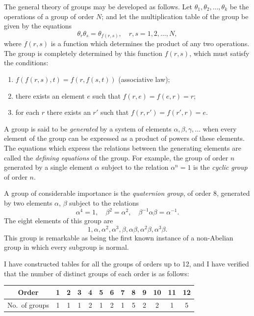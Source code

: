 \documentclass[11pt,a4paper]{article}
\begin{document}
\setcounter{page}{90}

The general theory of groups may be developed as follows. Let $\theta_1, \theta_2, \ldots, \theta_k$ be the operations of a group of order $N$; and let the multiplication table of the group be given by the equations
\[
\theta_r \theta_s = \theta_{f(r,s)}, \quad r,s = 1,2,\ldots,N,
\]
where $f(r,s)$ is a function which determines the product of any two operations. The group is completely determined by this function $f(r,s)$, which must satisfy the conditions:
\begin{enumerate}[label=(\roman*)]
\item $f(f(r,s),t) = f(r,f(s,t))$ (associative law);
\item there exists an element $e$ such that $f(r,e)=f(e,r)=r$;
\item for each $r$ there exists an $r'$ such that $f(r,r')=f(r',r)=e$.
\end{enumerate}

\setcounter{page}{91}

A group is said to be \textit{generated} by a system of elements $\alpha, \beta, \gamma, \ldots$ when every element of the group can be expressed as a product of powers of these elements. The equations which express the relations between the generating elements are called the \textit{defining equations} of the group. For example, the group of order $n$ generated by a single element $\alpha$ subject to the relation $\alpha^n = 1$ is the \textit{cyclic group} of order $n$.

A group of considerable importance is the \textit{quaternion group}, of order 8, generated by two elements $\alpha$, $\beta$ subject to the relations
\[
\alpha^4 = 1, \quad \beta^2 = \alpha^2, \quad \beta^{-1}\alpha\beta = \alpha^{-1}.
\]
The eight elements of this group are
\[
1, \alpha, \alpha^2, \alpha^3, \beta, \alpha\beta, \alpha^2\beta, \alpha^3\beta.
\]
This group is remarkable as being the first known instance of a non-Abelian group in which every subgroup is normal.

\setcounter{page}{92}

I have constructed tables for all the groups of orders up to 12, and I have verified that the number of distinct groups of each order is as follows:

\begin{center}
\begin{tabular}{c|cccccccccccc}
\toprule
Order & 1 & 2 & 3 & 4 & 5 & 6 & 7 & 8 & 9 & 10 & 11 & 12 \\
\midrule
No.\ of groups & 1 & 1 & 1 & 2 & 1 & 2 & 1 & 5 & 2 & 2 & 1 & 5 \\
\bottomrule
\end{tabular}
\end{center}
\end{document}
